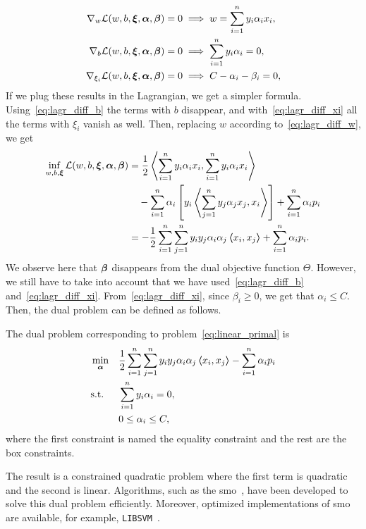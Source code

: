 \begin{align}
    \nabla_w \lagr(w, b, \fv{\xi}, \fv{\alpha}, \fv{\beta}) = 0 &\implies w = \sum_{i=1}^\nsamples y_i \alpha_i x_i , \label{eq:lagr_diff_w} \\
    \nabla_b \lagr(w, b, \fv{\xi}, \fv{\alpha}, \fv{\beta}) = 0 &\implies \sum_{i=1}^\nsamples y_i \alpha_i = 0, \label{eq:lagr_diff_b} \\
    \nabla_{\xi_i} \lagr(w, b, \fv{\xi}, \fv{\alpha}, \fv{\beta}) = 0 &\implies C - \alpha_i - \beta_i = 0 , \label{eq:lagr_diff_xi}
\end{align}
If we plug these results in the Lagrangian, we get a simpler formula. Using~\eqref{eq:lagr_diff_b} the terms with $b$ disappear, and with~\eqref{eq:lagr_diff_xi} all the terms with $\xi_i$ vanish as well. Then, replacing $w$ according to~\eqref{eq:lagr_diff_w}, we get 
\begin{equation}
    \nonumber
    \begin{aligned}
        \inf_{w, b, \bm{\xi}} \mathcal{L}(w, b, \bm{\xi}, \bm{\alpha}, \bm{\beta}) &= \frac{1}{2} \bm{\left\langle} \sum_{i=1}^n y_i \alpha_i x_i, \sum_{i=1}^n y_i \alpha_i x_i \bm{\right\rangle} \\
        &\quad- \sum_{i=1}^n \alpha_i \left[y_i \bm{\left\langle} \sum_{j=1}^n y_j \alpha_j x_j, x_i \bm{\right\rangle}  \right] + \sum_{i=1}^n \alpha_i p_i \\
        &= -\frac{1}{2} \sum_{i=1}^n \sum_{j=1}^n y_i y_j \alpha_i \alpha_j \bm{\left\langle} x_i, x_j \bm{\right\rangle} + \sum_{i=1}^n \alpha_i p_i .
    \end{aligned}
\end{equation}
We observe here that $\bm{\beta}$ disappears from the dual objective function $\Theta$. However, we still have to take into account that we have used~\eqref{eq:lagr_diff_b} and~\eqref{eq:lagr_diff_xi}. From~\eqref{eq:lagr_diff_xi}, since $\beta_i \geq 0$, we get that $\alpha_i \leq C$. Then, the dual problem can be defined as follows.
\begin{definition}
    The dual problem corresponding to problem~\eqref{eq:linear_primal} is
    \begin{equation}
        \label{eq:linear_dual}
        \begin{aligned}
            &\min_{\fv{\alpha}} & & \frac{1}{2} \sum_{i=1}^\nsamples \sum_{j=1}^\nsamples y_i y_j \alpha_i \alpha_j \dotp{x_i}{x_j} - \sum_{i=1}^\nsamples \alpha_i p_i \\
            & \text{s.t.} & & \sum_{i=1}^\nsamples y_i \alpha_i = 0 , \\
            & & & 0 \leq \alpha_i \leq C ,      
        \end{aligned}  
    \end{equation}
    where the first constraint is named the equality constraint and the rest are the box constraints.
\end{definition}
The result is a constrained quadratic problem where the first term is quadratic and the second is linear. Algorithms, such as the \acrfull{smo}~\citep{KeerthiSBM01}, have been developed to solve this dual problem efficiently. Moreover, optimized implementations of \acrshort{smo} are available, for example, \texttt{LIBSVM}~\citep{ChangL11}.

